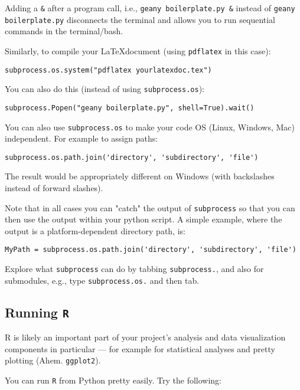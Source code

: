 Adding a {\tt \&} after a program call, i.e., {\tt geany boilerplate.py 
\&} instead of {\tt geany boilerplate.py} disconnects the terminal and 
allows you to run sequential commands in the terminal/bash.
 
Similarly, to compile your \LaTeX document (using {\tt pdflatex} in this case):

\begin{lstlisting}
subprocess.os.system("pdflatex yourlatexdoc.tex")
\end{lstlisting}
  
You can also do this (instead of using {\tt subprocess.os}):
\begin{lstlisting}
subprocess.Popen("geany boilerplate.py", shell=True).wait()
\end{lstlisting}
  
You can also use {\tt subprocess.os} to make your code OS (Linux, 
Windows, Mac) independent. For example to assign paths:
\begin{lstlisting}
subprocess.os.path.join('directory', 'subdirectory', 'file')
\end{lstlisting}

The result would be appropriately different on Windows (with 
backslashes instead of forward slashes). 

Note that in all cases you can "catch" the output of {\tt subprocess} 
so that you can then use the output within your python script. A simple
example, where the output is a platform-dependent directory path, is: 
\begin{lstlisting}
MyPath = subprocess.os.path.join('directory', 'subdirectory', 'file')
\end{lstlisting}
Explore what {\tt subprocess} can do by tabbing {\tt subprocess.}, and also for
submodules, e.g., type {\tt subprocess.os.} and then tab.

\subsection{Running {\tt R}}

R is likely an important part of your project's analysis and data visualization components in particular --- for example for  statistical analyses and pretty plotting (Ahem. {\tt ggplot2}). 

You can run {\tt R} from Python pretty easily. Try the following:

